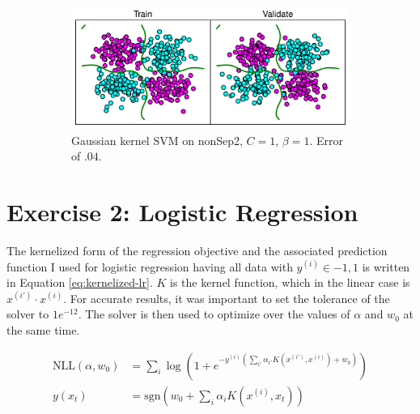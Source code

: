 \documentclass[10pt]{article}
\begin{document}
\begin{figure}[!ht]
\begin{subfigure}[t]{0.46\textwidth}
	\centering
	\includegraphics[width=.8\textwidth]{1-3-nonSep2-1-1-gaussian-REAL.pdf}
	\caption{Gaussian kernel SVM on nonSep2, $C = 1$, $\beta = 1$. Error of $.04$.}
	\label{fig:1-3-gaussian-larger-beta2}
\end{subfigure}
\caption{}
\label{fig:1-3-all4}
\end{figure}

\section{Exercise 2: Logistic Regression}

The kernelized form of the regression objective and the associated prediction function I used for logistic regression having all data with $y^{(i)} \in {-1, 1}$ is written in Equation \ref{eq:kernelized-lr}. $K$ is the kernel function, which in the linear case is $x^{(i')} \cdot x^{(i)}$. For accurate results, it was important to set the tolerance of the solver to $1e^{-12}$. The solver is then used to optimize over the values of $\alpha$ and $w_0$ at the same time.

\begin{subequations}
	\begin{align}
		\text{NLL}(\alpha, w_0) &= \sum_i \log \left(1 + e^{-y^{(i)}\left(\displaystyle\sum_{i'} \alpha_{i'} K(x^{(i')}, x^{(i)}) + w_0\right)}\right) \\
		y(x_t) &= \text{sgn}\left(w_0 + \sum_i \alpha_i K(x^{(i)}, x_t)\right)
	\end{align}
	\label{eq:kernelized-lr}
\end{subequations}
\end{document}
